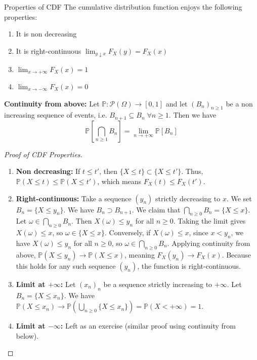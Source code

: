 \documentclass[11pt, a4paper]{article}
\begin{document}
\begin{proposition}{Properties of CDF}{}
The cumulative distribution function enjoys the following properties:
\begin{enumerate}
    \item It is non decreasing
    \item It is right-continuous $\lim_{y \downarrow x} F_X(y) = F_X(x)$
    \item $\lim_{x \to +\infty} F_X(x) = 1$
    \item $\lim_{x \to -\infty} F_X(x) = 0$
\end{enumerate}

\textbf{Continuity from above:} Let $\mathbb{P}: \mathcal{P}(\Omega) \to [0,1]$ and let $(B_n)_{n \ge 1}$ be a non increasing sequence of events, i.e. $B_{n+1} \subseteq B_n \; \forall n \ge 1$. Then we have
\[ \mathbb{P}\left[\bigcap_{n \ge 1} B_n\right] = \lim_{n \to +\infty} \mathbb{P}[B_n] \]
\end{proposition}

\begin{proof}[Proof of CDF Properties]
\begin{enumerate}
    \item \textbf{Non decreasing:} If $t \le t'$, then $\{X \le t\} \subset \{X \le t'\}$. Thus, $\mathbb{P}(X \le t) \le \mathbb{P}(X \le t')$, which means $F_X(t) \le F_X(t')$.
    \item \textbf{Right-continuous:} Take a sequence $(y_n)$ strictly decreasing to $x$. We set $B_n = \{X \le y_n\}$. We have $B_n \supset B_{n+1}$. We claim that $\bigcap_{n \ge 0} B_n = \{X \le x\}$. Let $\omega \in \bigcap_{n \ge 0} B_n$. Then $X(\omega) \le y_n$ for all $n \ge 0$. Taking the limit gives $X(\omega) \le x$, so $\omega \in \{X \le x\}$. Conversely, if $X(\omega) \le x$, since $x < y_n$, we have $X(\omega) \le y_n$ for all $n \ge 0$, so $\omega \in \bigcap_{n \ge 0} B_n$. Applying continuity from above, $\mathbb{P}(X \le y_n) \to \mathbb{P}(X \le x)$, meaning $F_X(y_n) \to F_X(x)$. Because this holds for any such sequence $(y_n)$, the function is right-continuous.
    \item \textbf{Limit at $+\infty$:} Let $(x_n)_n$ be a sequence strictly increasing to $+\infty$. Let $B_n = \{X \le x_n\}$. We have $\mathbb{P}(X \le x_n) \to \mathbb{P}\left(\bigcup_{n \ge 0} \{X \le x_n\}\right) = \mathbb{P}(X < +\infty) = 1$.
    \item \textbf{Limit at $-\infty$:} Left as an exercise (similar proof using continuity from below).
\end{enumerate}
\end{proof}
\end{document}
